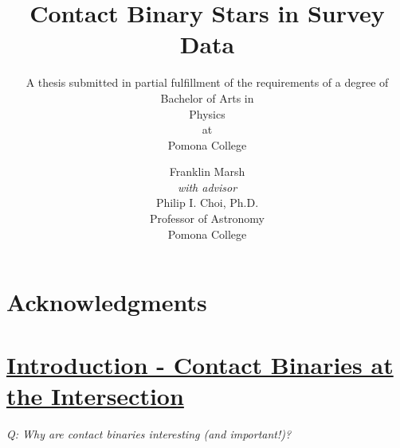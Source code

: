 \documentclass[12pt]{article} %
\title{\textbf{Contact Binary Stars in Survey Data}}
\author{Franklin Marsh\\
\small{\emph{with advisor}}\\
Philip I. Choi, Ph.D.\\
Professor of Astronomy\\ Pomona College}
\subtitle{A thesis submitted in partial fulfillment of the requirements of a degree of Bachelor of Arts
in\\
Physics\\
at\\
Pomona College}
\numberwithin{equation}{section} %
\begin{document}

\maketitle
\thispagestyle{empty}

\newpage

\thispagestyle{empty}
\begin{abstract}

\end{abstract}
\newpage


\thispagestyle{empty}
\section*{Acknowledgments}

\newpage


\tableofcontents %

\newpage %


\section[Introduction - Contact Binaries at the Intersection]{\hyperlink{toc}{Introduction - Contact Binaries at the Intersection}} \label{sec: intro}

\emph{Q: Why are contact binaries interesting (and important!)?}
\end{document}
